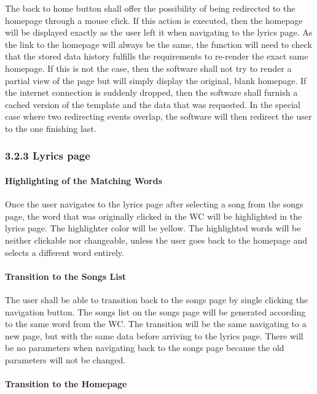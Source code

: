 \documentclass[]{article}
\begin{document}
The back to home button shall offer the possibility of being redirected
to the homepage through a mouse click. If this action is executed, then
the homepage will be displayed exactly as the user left it when
navigating to the lyrics page. As the link to the homepage will always
be the same, the function will need to check that the stored data
history fulfills the requirements to re-render the exact same homepage.
If this is not the case, then the software shall not try to render a
partial view of the page but will simply display the original, blank
homepage. If the internet connection is suddenly dropped, then the
software shall furnish a cached version of the template and the data
that was requested. In the special case where two redirecting events
overlap, the software will then redirect the user to the one finishing
last.

\subsubsection{3.2.3 Lyrics page}\label{lyrics-page}

\paragraph{Highlighting of the Matching
Words}\label{highlighting-of-the-matching-words}

Once the user navigates to the lyrics page after selecting a song from
the songs page, the word that was originally clicked in the WC will be
highlighted in the lyrics page. The highlighter color will be yellow.
The highlighted words will be neither clickable nor changeable, unless
the user goes back to the homepage and selects a different word
entirely.

\paragraph{Transition to the Songs
List}\label{transition-to-the-songs-list-1}

The user shall be able to transition back to the songs page by single
clicking the navigation button. The songs list on the songs page will be
generated according to the same word from the WC. The transition will be
the same navigating to a new page, but with the same data before
arriving to the lyrics page. There will be no parameters when navigating
back to the songs page because the old parameters will not be changed.

\paragraph{Transition to the
Homepage}\label{transition-to-the-homepage-1}
\end{document}
